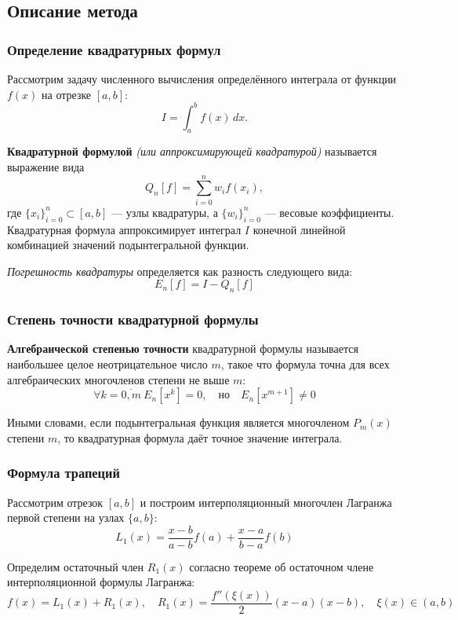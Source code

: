 \subsection{Описание метода}

\subsubsection{Определение квадратурных формул}

Рассмотрим задачу численного вычисления определённого интеграла от функции $f(x)$ на отрезке $[a, b]$:
\[
I = \int_a^b f(x) \, dx.
\]

\textbf{Квадратурной формулой} \textit{(или аппроксимирующей квадратурой)} называется выражение вида
\[
Q_n[f] = \sum_{i=0}^{n} w_i f(x_i),
\]
где $\{x_i\}_{i=0}^n \subset [a, b]$ --- узлы квадратуры, а $\{w_i\}_{i=0}^n$ --- весовые коэффициенты. 
Квадратурная формула аппроксимирует интеграл $I$ конечной линейной комбинацией значений подынтегральной функции. 

\textit{Погрешность квадратуры} определяется как разность следующего вида:
\[
E_n[f] = I - Q_n[f]
\]

\subsubsection{Степень точности квадратурной формулы}

\textbf{Алгебраической степенью точности} квадратурной формулы называется наибольшее целое неотрицательное число $m$, такое что формула точна для всех алгебраических многочленов степени не выше $m$:
\[
\forall k=\overline{0,m}\ E_n[x^k] = 0, \quad \text{но} \quad E_n[x^{m+1}] \neq 0
\]

Иными словами, если подынтегральная функция является многочленом $P_m(x)$ степени $m$, то квадратурная формула даёт точное значение интеграла. 

\subsubsection{Формула трапеций}

Рассмотрим отрезок \( [a,b] \) и построим интерполяционный многочлен Лагранжа первой степени на узлах \( \{a,b\} \):
\[
  L_1(x)=\frac{x-b}{a-b}f(a)+\frac{x-a}{b-a}f(b)
\]

Определим остаточный член \( R_1(x) \) согласно теореме об остаточном члене интерполяционной формулы Лагранжа:
\[
  f(x) = L_1(x) + R_1(x), \quad R_1(x) = \frac{f''(\xi(x))}{2}(x-a)(x-b), \quad \xi(x) \in (a,b)
\]

